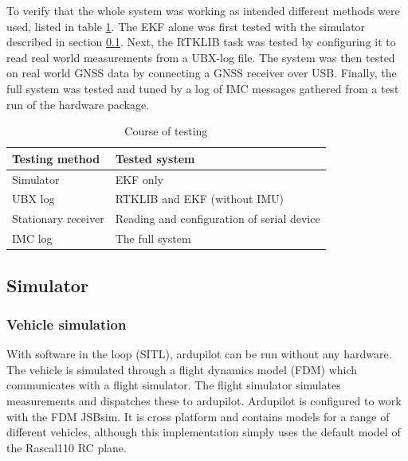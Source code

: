 

To verify that the whole system was working as intended different methods were used, listed in table \ref{tab:testing}. The EKF alone was first tested with the simulator described in section \ref{sec:imp:simulator}. Next, the RTKLIB task was tested by configuring it to read real world measurements from a UBX-log file. The system was then tested on real world GNSS data by connecting a GNSS receiver over USB. Finally, the full system was tested and tuned by a log of IMC messages gathered from a test run of the hardware package.\\
\label{sec:imp:testing}
\begin{table}[!htbp]
    \centering
    \begin{tabular}{|l|l|}\hline
         \textbf{Testing method}& \textbf{Tested system}\\\hline
         Simulator              & EKF only\\
         UBX log                & RTKLIB and EKF (without IMU)\\
         Stationary receiver    & Reading and configuration of serial device\\
         IMC log                & The full system\\\hline
    \end{tabular}
    \caption{Course of testing}
    \label{tab:testing}
\end{table}
    
\subsection{Simulator}
\label{sec:imp:simulator}
    \subsubsection{Vehicle simulation}
        With software in the loop (SITL), ardupilot can be run without any hardware. The vehicle is simulated through a flight dynamics model (FDM) which communicates with a flight simulator. The flight simulator simulates measurements and dispatches these to ardupilot. Ardupilot is configured to work with the FDM JSBsim. It is cross platform and contains models for a range of different vehicles, although this implementation simply uses the default model of the Rascal110 RC plane. \\
    
